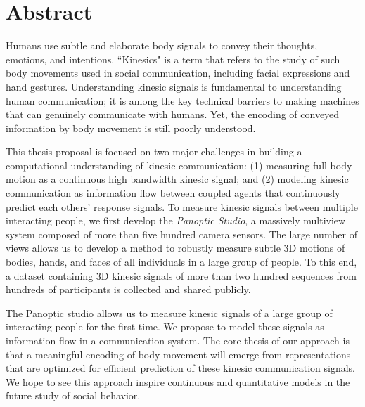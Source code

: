\documentclass[oneside,letterpaper]{memoir}
\begin{document}
\frontmatter





\newpage
\section*{Abstract}
Humans use subtle and elaborate body signals to convey their thoughts, emotions, and intentions. ``Kinesics" is a term that refers to the study of such body movements used in social communication, including facial expressions and hand gestures. Understanding kinesic signals is fundamental to understanding human communication; it is among the key technical barriers to making machines that can genuinely communicate with humans. Yet, the encoding of conveyed information by body movement is still poorly understood.

This thesis proposal is focused on two major challenges in building a computational understanding of kinesic communication: (1) measuring full body motion as a continuous high bandwidth kinesic signal; and (2) modeling kinesic communication as information flow between coupled agents that continuously predict each others' response signals.  To measure kinesic signals between multiple interacting people, we first develop the \emph{Panoptic Studio}, a massively multiview system composed of more than five hundred camera sensors. The large number of views allows us to develop a method to robustly measure subtle 3D motions of bodies, hands, and faces of all individuals in a large group of people. To this end, a dataset containing 3D kinesic signals of more than two hundred sequences from hundreds of participants is collected and shared publicly.

The Panoptic studio allows us to measure kinesic signals of a large group of interacting people for the first time. We propose to model these signals as information flow in a communication system. The core thesis of our approach is that a meaningful encoding of body movement will emerge from representations that are optimized for efficient prediction of these kinesic communication signals. We hope to see this approach inspire continuous and quantitative models in the future study of social behavior. 
\end{document}
